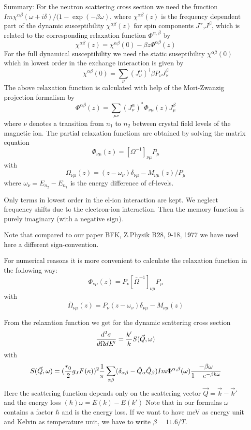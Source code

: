 \bigskip
\noindent


Summary:
For the neutron scattering cross section we need the function 
$Im \chi^{\alpha\beta}(\omega+i\delta)/(1-\exp(-\beta\omega)$, where
$\chi^{\alpha\beta}(z)$ is the frequency dependent part of the dynamic
susceptibility $\chi^{\alpha\beta}(z)$ for spin components  $J^\alpha$,$J^\beta$, which is
related to the corresponding relaxation function $\Phi^{\alpha,\beta}$ by
$$
\chi^{\alpha\beta}(z) = \chi^{\alpha\beta}(0) - \beta z \Phi^{\alpha\beta}(z)  
$$
For the full dynamical susceptibility we need the static suseptibility
$ \chi^{\alpha\beta}(0) $
which  in lowest order in the exchange interaction is given by 
$$
\chi^{\alpha\beta}(0)  = \sum_\nu  (J^\alpha_\nu)^\dagger \beta P_\nu J^\beta_\nu
$$
The above relaxation function is calculated with help of the Mori-Zwanzig
projection formalism by 
$$
\Phi^{\alpha\beta}(z)=\sum_{\mu\nu}
(J^\alpha_\nu)^*\Phi_{\nu\mu}(z)J^\beta_\mu
$$
where $\nu$ denotes a transition from $n_1$ to $n_2$ between crystal field
levels of the magnetic ion. The partial relaxation functions are obtained by 
solving the matrix
equation
$$
\Phi_{\nu\mu}(z)= [\Omega^{-1}]_{\nu\mu}P_\mu      
$$
with
$$
\Omega_{\nu\mu}(z)= (z-\omega_\nu)\delta_{\nu\mu}  -M_{\nu\mu}(z)/P_\mu
$$
where $\omega_\nu =E_{n_2}- E_{n_1}$ is the energy difference of cf-levels.

Only terms in  lowest  order in the el-ion interaction are kept. We neglect
frequency shifts due to the electron-ion interaction. 
Then the  memory function is purely
imaginary (with a negative  sign).

Note that compared to our paper BFK, Z.Physik B28, 9-18, 1977 we have used here 
a different sign-convention.

For numerical reasons it is more convenient to calculate the relaxation
function in the following way:
$$
\Phi_{\nu\mu}(z)= P_\nu[\bar\Omega^{-1}]_{\nu\mu}P_\mu      
$$
with
$$
\bar \Omega_{\nu\mu}(z)= P_\nu(z-\omega_\nu)\delta_{\nu\mu}  - M_{\nu\mu}(z)
$$

From the relaxation function we get for the dynamic scattering cross section 
$$
{d^2\sigma \over d\Omega d E'} =  {k' \over
k}S(\vec Q,\omega)
$$
with
$$
S(\vec Q, \omega)=({r_0\over 2}g_J F(\kappa))^2{1\over \pi }
\sum_{\alpha\beta}(\delta_{\alpha\beta} 
- \hat Q_\alpha \hat Q_\beta)
Im \Phi^{\alpha,\beta}(\omega){-\beta \omega \over 1-e^{-\beta \hbar \omega}} 
$$
Here the scattering function depends only on the scattering vector
$\vec Q= \vec k - \vec k'$ and the energy loss $(\hbar)\omega =E(k)-E(k')$
Note that in our formulas $\omega$ contains a factor $\hbar$ and is the
energy loss. If we want to have meV as energy unit and Kelvin as temperature
unit, we have to write $\beta= 11.6/T$.
   
